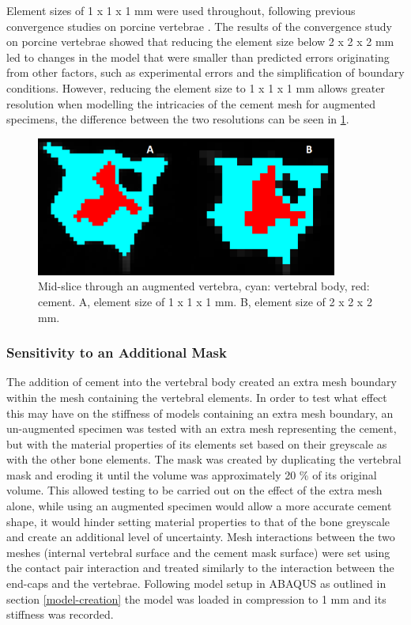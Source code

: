Element sizes of 1 x 1 x 1 mm were used throughout, following previous
convergence studies on porcine vertebrae \cite{Jones2007}. The
results of the convergence study on porcine vertebrae showed that reducing the element
size below 2 x 2 x 2 mm led to changes in the model that were smaller
than predicted errors originating from other factors, such as
experimental errors and the simplification of boundary conditions.
However, reducing the element size to 1 x 1 x 1 mm allows greater
resolution when modelling the intricacies of the cement mesh for
augmented specimens, the difference between the two resolutions can be
seen in \cref{fig:vertslice}.

\begin{figure}[ht!]

\centering
\includegraphics[width=3.90994in,height=1.80208in]{images/res_comp.png}
\caption{Mid-slice through an augmented vertebra, cyan: vertebral body, red:
cement. A, element size of 1 x 1 x 1 mm. B, element size of 2 x 2 x
2 mm.}
\label{fig:vertslice}
\end{figure}


\subsubsection{Sensitivity to an Additional
Mask}\label{sensitivity-to-an-additional-mask}

The addition of cement into the vertebral body created an extra mesh boundary
within the mesh containing the vertebral elements. In order to test what
effect this may have on the stiffness of models containing an extra
mesh boundary, an un-augmented specimen was tested with an extra mesh
representing the cement, but with the material properties of its
elements set based on their greyscale as with the other bone elements.
The mask was created by duplicating the vertebral mask and eroding it
until the volume was approximately 20 \% of its original volume. This
allowed testing to be carried out on the effect of the extra mesh alone,
while using an augmented specimen would allow a more accurate cement
shape, it would hinder setting material properties to that of the bone
greyscale and create an additional level of uncertainty. Mesh
interactions between the two meshes (internal vertebral surface and the
cement mask surface) were set using the contact pair interaction and
treated similarly to the interaction between the end-caps and the
vertebrae. Following model setup in ABAQUS as outlined in section \ref{model-creation} the model
was loaded in compression to 1 mm and its stiffness was recorded.

